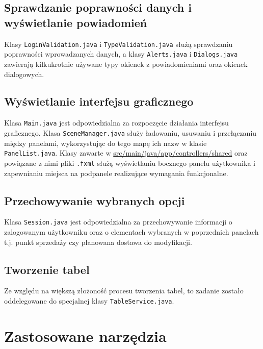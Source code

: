 \documentclass[a4paper,12pt]{article}
\begin{document}
\subsection{Sprawdzanie poprawności danych i wyświetlanie powiadomień}

Klasy \texttt{LoginValidation.java} i \texttt{TypeValidation.java} służą sprawdzaniu poprawności wprowadzanych danych, a klasy \texttt{Alerts.java} i \texttt{Dialogs.java} zawierają kilkukrotnie używane typy okienek z powiadomieniami oraz okienek dialogowych.

\subsection{Wyświetlanie interfejsu graficznego}

Klasa \texttt{Main.java} jest odpowiedzialna za rozpoczęcie działania interfejsu graficznego.
Klasa \texttt{SceneManager.java} służy ładowaniu, usuwaniu i przełączaniu między panelami, wykorzystując do tego mapę ich nazw w klasie \texttt{PanelList.java}.
Klasy zawarte w \url{src/main/java/app/controllers/shared} oraz powiązane z nimi pliki \texttt{.fxml} służą wyświetlaniu bocznego panelu użytkownika i zapewnianiu miejsca na podpanele realizujące wymagania funkcjonalne.

\subsection{Przechowywanie wybranych opcji}

Klasa \texttt{Session.java} jest odpowiedzialna za przechowywanie informacji o zalogowanym użytkowniku oraz o elementach wybranych w poprzednich panelach t.j. punkt sprzedaży czy planowana dostawa do modyfikacji.

\subsection{Tworzenie tabel}

Ze względu na większą złożoność procesu tworzenia tabel, to zadanie zostało oddelegowane do specjalnej klasy \texttt{TableService.java}.

\section{Zastosowane narzędzia}
\end{document}
